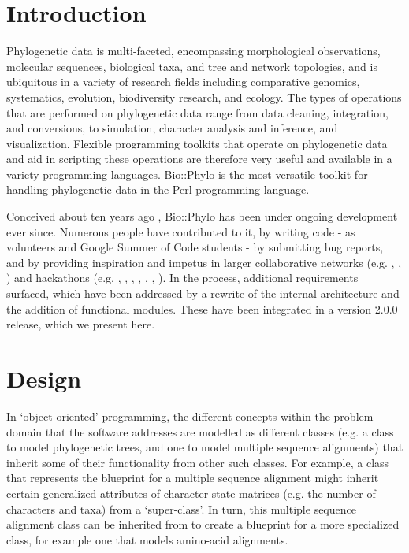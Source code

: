 \documentclass{bioinfo}
\begin{document}
\section{Introduction}

Phylogenetic data is multi-faceted, encompassing morphological observations, molecular 
sequences, biological taxa, and tree and network topologies, and is ubiquitous in a 
variety of research fields including comparative genomics, systematics, evolution, 
biodiversity research, and ecology. The types of operations that are performed on 
phylogenetic data range from data cleaning, integration, and conversions, to simulation,
character analysis and inference, and visualization. Flexible programming toolkits that
operate on phylogenetic data and aid in scripting these operations are therefore very 
useful and available in a variety programming languages. Bio::Phylo \citep{Vos2011} is 
the most versatile toolkit for handling phylogenetic data in the Perl programming
language.

Conceived about ten years ago \citep{Vos2006,Vos2017}, Bio::Phylo has been under
ongoing development ever since. Numerous people have contributed to it, by writing code 
- as volunteers and Google Summer of Code students - by submitting bug reports, and by 
providing inspiration and impetus in larger collaborative networks (e.g. 
\citet{Stoltzfus2010}, \citet{Koureas2016}, \citet{Koureas2016a}) and hackathons (e.g. 
\citet{Lapp2007}, \citet{Katayama2010}, \citet{Katayama2011}, \citet{Katayama2013}, 
\citet{Stoltzfus2013}, \citet{Katayama2014}, \citet{Vos2014}). In the process, additional
requirements surfaced, which have been addressed by a rewrite of the internal architecture
and the addition of functional modules. These have been integrated in a version 2.0.0
release, which we present here.

\section{Design}

In `object-oriented' programming, the different concepts within the problem domain that
the software addresses are modelled as different classes (e.g. a class to model 
phylogenetic trees, and one to model multiple sequence alignments) that inherit some of 
their functionality from other such classes. For example, a class that represents the 
blueprint for a multiple sequence alignment might inherit certain generalized attributes 
of character state matrices (e.g. the number of characters and taxa) from a `super-class'. 
In turn, this multiple sequence alignment class can be inherited from to create a 
blueprint for a more specialized class, for example one that models amino-acid alignments. 
\end{document}

